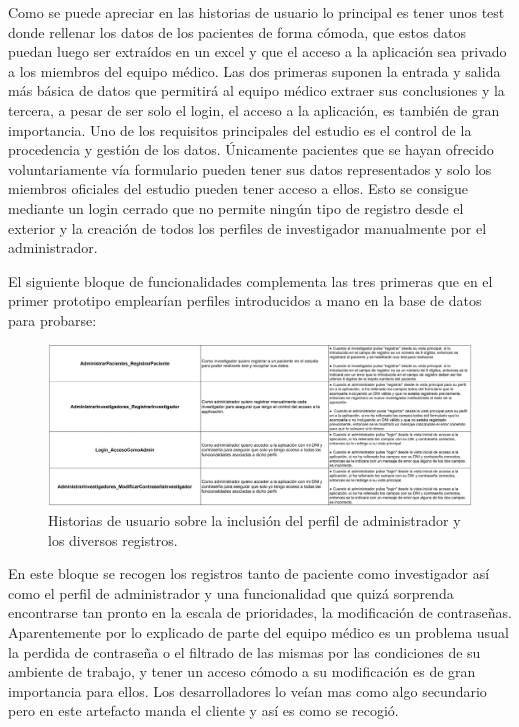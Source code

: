 Como se puede apreciar en las historias de usuario lo principal es tener unos test donde rellenar los datos de los pacientes de forma cómoda, que estos datos puedan luego ser extraídos en un excel y que el acceso a la aplicación sea privado a los miembros del equipo médico. Las dos primeras suponen la entrada y salida más básica de datos que permitirá al equipo médico extraer sus conclusiones y la tercera, a pesar de ser solo el login, el acceso a la aplicación, es también de gran importancia. Uno de los requisitos principales del estudio es el control de la procedencia y gestión de los datos. Únicamente pacientes que se hayan ofrecido voluntariamente vía formulario pueden tener sus datos representados y solo los miembros oficiales del estudio pueden tener acceso a ellos. Esto se consigue mediante un login cerrado que no permite ningún tipo de registro desde el exterior y la creación de todos los perfiles de investigador manualmente por el administrador.
\newline

El siguiente bloque de funcionalidades complementa las tres primeras que en el primer prototipo emplearían perfiles introducidos a mano en la base de datos para probarse:
\newline

 \begin{figure}[h]
    \centering
     \includegraphics[width=1\textwidth]{images/historiasUsuario-2.jpg}
    \caption{Historias de usuario sobre la inclusión del perfil de administrador y los diversos registros.}
\end{figure}
\newline

En este bloque se recogen los registros tanto de paciente como investigador así como el perfil de administrador y una funcionalidad que quizá sorprenda encontrarse tan pronto en la escala de prioridades, la modificación de contraseñas. Aparentemente por lo explicado de parte del equipo médico es un problema usual la perdida de contraseña o el filtrado de las mismas por las condiciones de su ambiente de trabajo, y tener un acceso cómodo a su modificación es de gran importancia para ellos. Los desarrolladores lo veían mas como algo secundario pero en este artefacto manda el cliente y así es como se recogió.
\newpage

